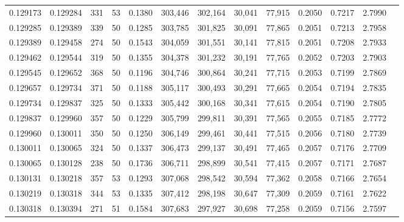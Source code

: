 \begin{tabular}{rrrrrrrrrrrrr}
0.129173 & 0.129284 &   331 &  53 &                                     0.1380 & 303,446 & 302,164 &  30,041 &  77,915 & 0.2050 & 0.7217 & 2.7990 \\
0.129285 & 0.129389 &   339 &  50 &                                     0.1285 & 303,785 & 301,825 &  30,091 &  77,865 & 0.2051 & 0.7213 & 2.7958 \\
0.129389 & 0.129458 &   274 &  50 &                                     0.1543 & 304,059 & 301,551 &  30,141 &  77,815 & 0.2051 & 0.7208 & 2.7933 \\
0.129462 & 0.129544 &   319 &  50 &                                     0.1355 & 304,378 & 301,232 &  30,191 &  77,765 & 0.2052 & 0.7203 & 2.7903 \\
0.129545 & 0.129652 &   368 &  50 &                                     0.1196 & 304,746 & 300,864 &  30,241 &  77,715 & 0.2053 & 0.7199 & 2.7869 \\
0.129657 & 0.129734 &   371 &  50 &                                     0.1188 & 305,117 & 300,493 &  30,291 &  77,665 & 0.2054 & 0.7194 & 2.7835 \\
0.129734 & 0.129837 &   325 &  50 &                                     0.1333 & 305,442 & 300,168 &  30,341 &  77,615 & 0.2054 & 0.7190 & 2.7805 \\
0.129837 & 0.129960 &   357 &  50 &                                     0.1229 & 305,799 & 299,811 &  30,391 &  77,565 & 0.2055 & 0.7185 & 2.7772 \\
0.129960 & 0.130011 &   350 &  50 &                                     0.1250 & 306,149 & 299,461 &  30,441 &  77,515 & 0.2056 & 0.7180 & 2.7739 \\
0.130011 & 0.130065 &   324 &  50 &                                     0.1337 & 306,473 & 299,137 &  30,491 &  77,465 & 0.2057 & 0.7176 & 2.7709 \\
0.130065 & 0.130128 &   238 &  50 &                                     0.1736 & 306,711 & 298,899 &  30,541 &  77,415 & 0.2057 & 0.7171 & 2.7687 \\
0.130131 & 0.130218 &   357 &  53 &                                     0.1293 & 307,068 & 298,542 &  30,594 &  77,362 & 0.2058 & 0.7166 & 2.7654 \\
0.130219 & 0.130318 &   344 &  53 &                                     0.1335 & 307,412 & 298,198 &  30,647 &  77,309 & 0.2059 & 0.7161 & 2.7622 \\
0.130318 & 0.130394 &   271 &  51 &                                     0.1584 & 307,683 & 297,927 &  30,698 &  77,258 & 0.2059 & 0.7156 & 2.7597 \\

\end{tabular}
